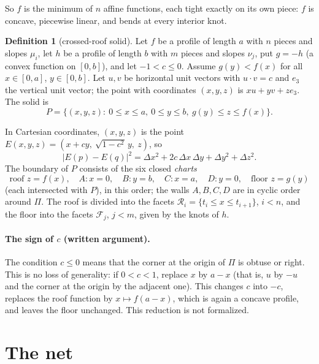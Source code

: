 \documentclass[11pt]{article}
\theoremstyle{definition}
\newtheorem{definition}{Definition}
\theoremstyle{remark}
\newcommand{\cR}{\mathcal R}
\newcommand{\cF}{\mathcal F}
\begin{document}
\noindent So $f$ is the minimum of $n$ affine functions, each tight exactly
on its own piece: $f$ is concave, piecewise linear, and bends at every interior
knot.

\begin{definition}[crossed-roof solid]\label{def:solid}
Let $f$ be a profile of length $a$ with $n$ pieces and slopes $\mu_i$, let
$h$ be a profile of length $b$ with $m$ pieces and slopes $\nu_j$, put
$g=-h$ (a convex function on $[0,b]$), and let $-1<c\le0$. Assume
$g(y)<f(x)$ for all $x\in[0,a]$, $y\in[0,b]$. Let $u,v$ be horizontal unit
vectors with $u\cdot v=c$ and $e_3$ the vertical unit vector; the point with
coordinates $(x,y,z)$ is $xu+yv+ze_3$. The solid is
\[
P=\{(x,y,z):\ 0\le x\le a,\ 0\le y\le b,\ g(y)\le z\le f(x)\}.
\]
\end{definition}

\noindent In Cartesian coordinates, $(x,y,z)$ is the point
$E(x,y,z)=(x+cy,\ \sqrt{1-c^2}\,y,\ z)$, so
\begin{equation}\label{eq:gram}
|E(p)-E(q)|^2=\Delta x^2+2c\,\Delta x\,\Delta y+\Delta y^2+\Delta z^2 .
\end{equation}
The boundary of $P$ consists of the six closed \emph{charts}
\[
\text{roof } z=f(x),\quad A: x=0,\quad B: y=b,\quad C: x=a,\quad D: y=0,\quad \text{floor } z=g(y)
\]
(each intersected with $P$), in this order; the walls $A,B,C,D$ are in
cyclic order around $\Pi$. The roof is divided into the facets
$\cR_i=\{t_i\le x\le t_{i+1}\}$, $i<n$, and the floor into the facets
$\cF_j$, $j<m$, given by the knots of $h$.

\paragraph{The sign of $c$ (written argument).} The condition $c\le0$ means
that the corner at the origin of $\Pi$ is obtuse or right. This is no loss of
generality: if $0<c<1$, replace $x$ by $a-x$ (that is, $u$ by $-u$ and the
corner at the origin by the adjacent one). This changes $c$ into $-c$,
replaces the roof function by $x\mapsto f(a-x)$, which is again a concave
profile, and leaves the floor unchanged. This reduction is not formalized.

\section{The net}\label{sec:net}
\end{document}
